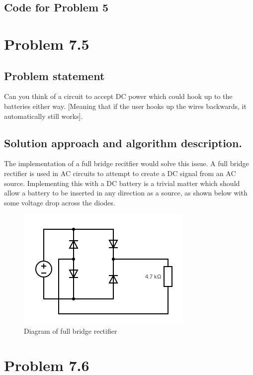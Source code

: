 \documentclass[letterpaper,11pt]{texMemo} %
\begin{document}
\newpage
\subsection*{Code for Problem 5}
\begin{tiny}

\end{tiny}

\newpage
\section*{Problem 7.5}
\subsection*{Problem statement}
Can you think of a circuit to accept DC power which could hook up to the batteries either way.
[Meaning that if the user hooks up the wires backwards, it automatically still works].

\subsection*{Solution approach and algorithm description.}
The implementation of a full bridge recitfier would solve this issue. A full bridge rectifier is used 
in AC circuits to attempt to create a DC signal from an AC source. Implementing this with a DC battery is a 
trivial matter which should allow a battery to be inserted in any direction as a source, as shown below with some 
voltage drop across the diodes.

\begin{figure}[ht]
    \caption{Diagram of full bridge rectifier}
    \centering
    \includegraphics[scale=0.45]{img/FBR.png}
\end{figure}


\newpage
\section*{Problem 7.6}
\end{document}
